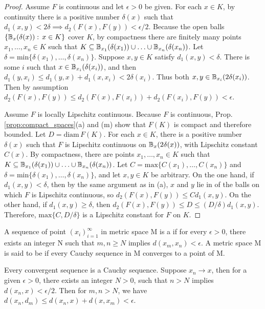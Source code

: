 \documentclass[11pt,a4paper]{article}
\begin{document}
\begin{proof}
 Assume $F$ is continuous and let $\epsilon>0$ be given. For each $x\in K$, by continuity there is a positive number $\delta(x)$ such that $d_1(x,y)<2\delta\implies d_2(F(x),F(y))<\epsilon/2$. Because the open balls $\{\mathbb{B}_{x}(\delta(x)):\,x\in K\}$ cover $K$, by compactness there are finitely many points $x_1,\ldots,x_n\in K$ such that $K\subseteq \mathbb{B}_{x_1}(\delta(x_1))\cup\ldots\cup \mathbb{B}_{x_n}(\delta(x_n))$. Let $\delta=\text{min}\{\delta(x_1),\ldots,\delta(x_n)\}$. Suppose $x,y\in K$ satisfy $d_1(x,y)<\delta$. There is some $i$ such that $x\in \mathbb{B}_{x_i}(\delta(x_i))$, and then $d_1(y,x_i)\le d_1(y,x)+d_1(x,x_i)<2\delta(x_i)$. Thus both $x,y\in \mathbb{B}_{x_i}(2\delta(x_i))$. Then by assumption $d_2(F(x),F(y))\le d_2(F(x),F(x_i)) + d_2(F(x_i),F(y)) < \epsilon$.

 Assume $F$ is locally Lipschitz continuous. Because $F$ is continuous, Prop. \ref{prop:compact_spaces}(a) and (m) show that $F(K)$ is compact and therefore bounded. Let $D = \text{diam}\,F(K)$. For each $x\in K$, there is a positive number $\delta(x)$ such that $F$ is Lipschitz continuous on $\mathbb{B}_{x}(2\delta(x))$, with Lipschitz constant $C(x)$. By compactness, there are points $x_1,\ldots,x_n\in K$ such that $K\subseteq \mathbb{B}_{x_1}(\delta(x_1))\cup\ldots\cup \mathbb{B}_{x_n}(\delta(x_n))$. Let $C = \text{max}\{C(x_1),\ldots,C(x_n)\}$ and $\delta = \text{min}\{\delta(x_1),\ldots,\delta(x_n)\}$, and let $x,y\in K$ be arbitrary. On the one hand, if $d_1(x,y)<\delta$, then by the same argument as in (a), $x$ and $y$ lie in of the balls on which $F$ is Lipschitz continuous, so $d_2(F(x),F(y))\le Cd_1(x,y)$. On the other hand, if $d_1(x,y)\ge \delta$, then $d_2(F(x),F(y))\le D\le (D/\delta)d_1(x,y)$. Therefore, $\text{max}\{C,D/\delta\}$ is a Lipschitz constant for $F$ on $K$.
\end{proof}

\begin{mydef}
A sequence of point $(x_i)_{i=1}^\infty$ in metric space M is a  if for every $\epsilon>0$, there exists an integer N such that $m,n\ge N$ implies $d(x_m,x_n)<\epsilon$. A metric space M is said to be  if every Cauchy sequence in M converges to a point of M.
\end{mydef}

\begin{remark}
Every convergent sequence is a Cauchy sequence. Suppose $x_n\rightarrow x$, then for a given $\epsilon>0$, there exists an integer $N>0$, such that $n>N$ implies $d(x_n,x)<\epsilon/2$. Then for $m,n>N$, we have $d(x_n,d_m)\le d(x_n,x)+d(x,x_m)<\epsilon$.
\end{remark}
\end{document}
